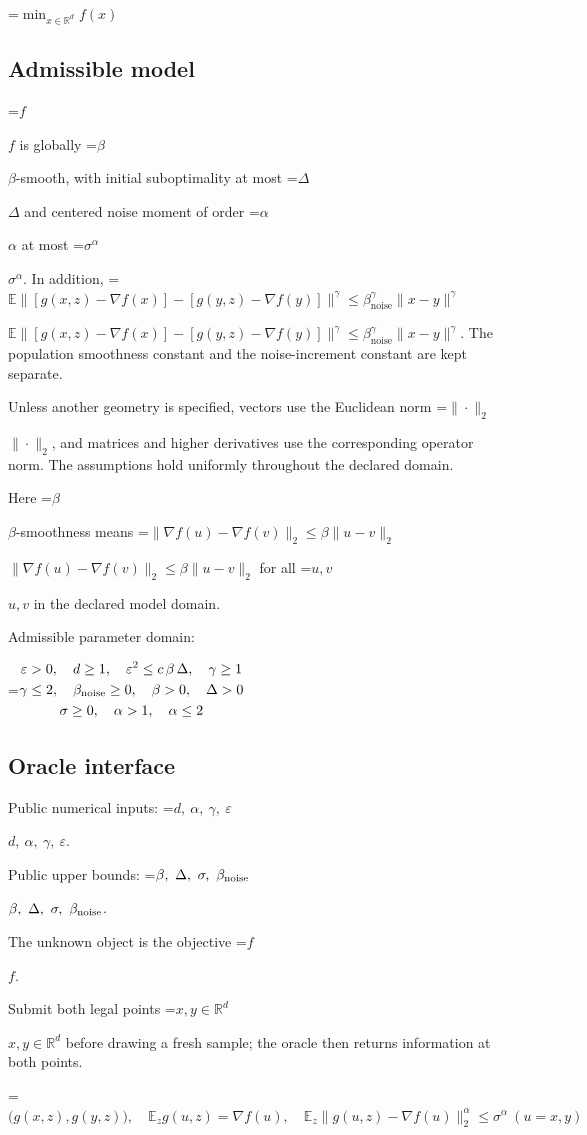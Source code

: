 \documentclass[10pt,a4paper]{article}
\newcommand{\AtlasMath}[1]{\par\begingroup\centering\setbox0=\hbox{$\displaystyle #1$}\ifdim\wd0>1.4\linewidth\typeout{ATLAS WIDE FORMULA: \the\wd0}\fi\ifdim\wd0>\linewidth\resizebox{\linewidth}{!}{\box0}\else\box0\fi\par\endgroup}
\newcommand{\AtlasInlineMath}[1]{\begingroup\setbox0=\hbox{$#1$}\ifdim\wd0>.4\linewidth\endgroup\AtlasMath{#1}\else\endgroup$#1$\fi}
\begin{document}
\AtlasMath{\min_{x\in \mathbb{R}^d}f(x)}


\subsection{Admissible model}
\AtlasInlineMath{f} is globally \AtlasInlineMath{\beta}-smooth, with initial suboptimality at most \AtlasInlineMath{\Delta} and centered noise moment of order \AtlasInlineMath{\alpha} at most \AtlasInlineMath{\sigma^\alpha}. In addition, \AtlasInlineMath{\mathbb E\|[g(x,z)-\nabla f(x)]-[g(y,z)-\nabla f(y)]\|^\gamma\le\beta_{\mathrm{noise}}^\gamma\|x-y\|^\gamma}. The population smoothness constant and the noise-increment constant are kept separate.

Unless another geometry is specified, vectors use the Euclidean norm \AtlasInlineMath{\|\cdot\|_2}, and matrices and higher derivatives use the corresponding operator norm. The assumptions hold uniformly throughout the declared domain.

Here \AtlasInlineMath{\beta}-smoothness means \AtlasInlineMath{\|\nabla f(u)-\nabla f(v)\|_2\le\beta\|u-v\|_2} for all \AtlasInlineMath{u,v} in the declared model domain.

Admissible parameter domain:


\AtlasMath{\begin{gathered}\varepsilon > 0,\quad d \ge 1,\quad {\varepsilon}^{2} \le c\,\beta\,\Delta,\quad \gamma \ge 1\\\gamma \le 2,\quad \beta_{\rm noise} \ge 0,\quad \beta > 0,\quad \Delta > 0\\\sigma \ge 0,\quad \alpha > 1,\quad \alpha \le 2\end{gathered}}


\subsection{Oracle interface}
Public numerical inputs: \AtlasInlineMath{d,\ \alpha,\ \gamma,\ \varepsilon}.

Public upper bounds: \AtlasInlineMath{\beta,\ \Delta,\ \sigma,\ \beta_{\rm noise}}.

The unknown object is the objective \AtlasInlineMath{f}.

Submit both legal points \AtlasInlineMath{x,y\in\mathbb R^d} before drawing a fresh sample; the oracle then returns information at both points.


\AtlasMath{\bigl(g(x,z),g(y,z)\bigr),\quad\mathbb{E}_zg(u,z)=\nabla f(u),\quad\mathbb{E}_z\|g(u,z)-\nabla f(u)\|_2^\alpha\le\sigma^\alpha\ (u=x,y)}
\end{document}
